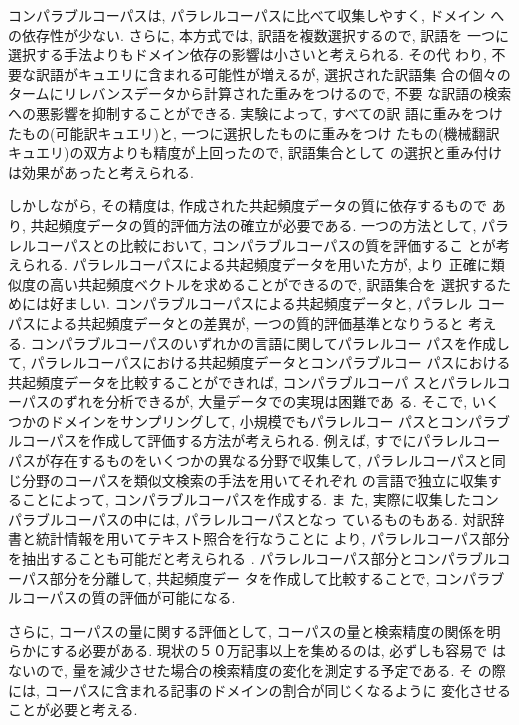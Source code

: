 
コンパラブルコーパスは, パラレルコーパスに比べて収集しやすく, ドメイン
への依存性が少ない. さらに, 本方式では, 訳語を複数選択するので, 訳語を
一つに選択する手法よりもドメイン依存の影響は小さいと考えられる. その代
わり, 不要な訳語がキュエリに含まれる可能性が増えるが, 選択された訳語集
合の個々のタームにリレバンスデータから計算された重みをつけるので, 不要
な訳語の検索への悪影響を抑制することができる. 実験によって, すべての訳
語に重みをつけたもの(可能訳キュエリ)と, 一つに選択したものに重みをつけ
たもの(機械翻訳キュエリ)の双方よりも精度が上回ったので, 訳語集合として
の選択と重み付けは効果があったと考えられる. 

しかしながら, その精度は, 作成された共起頻度データの質に依存するもので
あり, 共起頻度データの質的評価方法の確立が必要である. 一つの方法として, 
パラレルコーパスとの比較において, コンパラブルコーパスの質を評価するこ
とが考えられる. パラレルコーパスによる共起頻度データを用いた方が, より
正確に類似度の高い共起頻度ベクトルを求めることができるので, 訳語集合を
選択するためには好ましい. 
コンパラブルコーパスによる共起頻度データと, パラレル
コーパスによる共起頻度データとの差異が, 一つの質的評価基準となりうると
考える. 
コンパラブルコーパスのいずれかの言語に関してパラレルコー
パスを作成して, パラレルコーパスにおける共起頻度データとコンパラブルコー
パスにおける共起頻度データを比較することができれば, コンパラブルコーパ
スとパラレルコーパスのずれを分析できるが, 大量データでの実現は困難であ
る. そこで, いくつかのドメインをサンプリングして, 小規模でもパラレルコー
パスとコンパラブルコーパスを作成して評価する方法が考えられる. 例えば, 
すでにパラレルコーパスが存在するものをいくつかの異なる分野で収集して, 
パラレルコーパスと同じ分野のコーパスを類似文検索の手法を用いてそれぞれ
の言語で独立に収集することによって, コンパラブルコーパスを作成する. ま
た, 実際に収集したコンパラブルコーパスの中には, パラレルコーパスとなっ
ているものもある. 対訳辞書と統計情報を用いてテキスト照合を行なうことに
より, パラレルコーパス部分を抽出することも可能だと考えられる
\cite{Utsuro94al}. 
パラレルコーパス部分とコンパラブルコーパス部分を分離して, 共起頻度デー
タを作成して比較することで, コンパラブルコーパスの質の評価が可能になる. 

さらに, コーパスの量に関する評価として, コーパスの量と検索精度の関係を明
らかにする必要がある. 現状の５０万記事以上を集めるのは, 必ずしも容易で
はないので, 量を減少させた場合の検索精度の変化を測定する予定である. そ
の際には, コーパスに含まれる記事のドメインの割合が同じくなるように
変化させることが必要と考える. 

